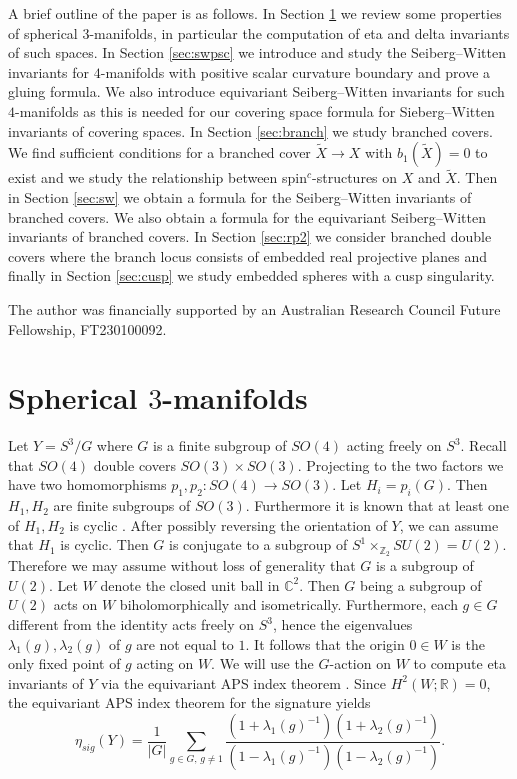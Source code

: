 \documentclass{amsart}
\theoremstyle{definition}
\theoremstyle{remark}
\numberwithin{equation}{section}
\begin{document}
A brief outline of the paper is as follows. In Section \ref{sec:spherical} we review some properties of spherical $3$-manifolds, in particular the computation of eta and delta invariants of such spaces. In Section \ref{sec:swpsc} we introduce and study the Seiberg--Witten invariants for $4$-manifolds with positive scalar curvature boundary and prove a gluing formula. We also introduce equivariant Seiberg--Witten invariants for such $4$-manifolds as this is needed for our covering space formula for Sieberg--Witten invariants of covering spaces. In Section \ref{sec:branch} we study branched covers. We find sufficient conditions for a branched cover $\widetilde{X} \to X$ with $b_1(\widetilde{X}) = 0$ to exist and we study the relationship between spin$^c$-structures on $X$ and $\widetilde{X}$. Then in Section \ref{sec:sw} we obtain a formula for the Seiberg--Witten invariants of branched covers. We also obtain a formula for the equivariant Seiberg--Witten invariants of branched covers. In Section \ref{sec:rp2} we consider branched double covers where the branch locus consists of embedded real projective planes and finally in Section \ref{sec:cusp} we study embedded spheres with a cusp singularity.

 The author was financially supported by an Australian Research Council Future Fellowship, FT230100092. 



\section{Spherical $3$-manifolds}\label{sec:spherical}

Let $Y = S^3/G$ where $G$ is a finite subgroup of $SO(4)$ acting freely on $S^3$. Recall that $SO(4)$ double covers $SO(3) \times SO(3)$. Projecting to the two factors we have two homomorphisms $p_1,p_2 : SO(4) \to SO(3)$. Let $H_i = p_i(G)$. Then $H_1,H_2$ are finite subgroups of $SO(3)$. Furthermore it is known that at least one of $H_1,H_2$ is cyclic \cite[, Lemma 4]{or}. After possibly reversing the orientation of $Y$, we can assume that $H_1$ is cyclic. Then $G$ is conjugate to a subgroup of $S^1 \times_{\mathbb{Z}_2} SU(2) = U(2)$. Therefore we may assume without loss of generality that $G$ is a subgroup of $U(2)$. Let $W$ denote the closed unit ball in $\mathbb{C}^2$. Then $G$ being a subgroup of $U(2)$ acts on $W$ biholomorphically and isometrically. Furthermore, each $g \in G$ different from the identity acts freely on $S^3$, hence the eigenvalues $\lambda_1(g),\lambda_2(g)$ of $g$ are not equal to $1$. It follows that the origin $0 \in W$ is the only fixed point of $g$ acting on $W$. We will use the $G$-action on $W$ to compute eta invariants of $Y$ via the equivariant APS index theorem \cite{don}.  Since $H^2(W ; \mathbb{R}) = 0$, the equivariant APS index theorem for the signature yields
\[
\eta_{sig}(Y) = \frac{1}{|G|} \sum_{g \in G, \, g \neq 1} \frac{(1 + \lambda_1(g)^{-1})(1+\lambda_2(g)^{-1})}{(1-\lambda_1(g)^{-1})(1-\lambda_2(g)^{-1})}.
\]
\end{document}
